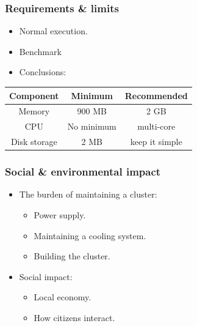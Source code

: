 \documentclass[12pt]{beamer}
\begin{document}
\begin{frame}
\vfill
  \frametitle{Requirements \& limits}
  \begin{center}
    \begin{itemize}
      \item Normal execution.
      \item Benchmark
      \item Conclusions:
    \end{itemize}
    \vbox{}
    \begin{tabular}{ | c | c | c | }
      \hline
      Component & Minimum & Recommended \\ \hline
      Memory & 900 MB & 2 GB \\
      CPU & No minimum & multi-core \\
      Disk storage & 2 MB & keep it simple \\ \hline
    \end{tabular}
  \end{center}
\vfill
\end{frame}

\begin{frame}
\vfill
  \frametitle{Social \& environmental impact}
  \begin{itemize}
    \item The burden of maintaining a cluster:
    \vfill
    \begin{itemize}
      \item Power supply.
      \vfill
      \item Maintaining a cooling system.
      \vfill
      \item Building the cluster.
      \vfill
    \end{itemize}
    \vfill
    \item Social impact:
    \vfill
    \begin{itemize}
      \item Local economy.
      \vfill
      \item How citizens interact.
      \vfill
    \end{itemize}

  \end{itemize}
\vfill
\end{frame}
\end{document}
